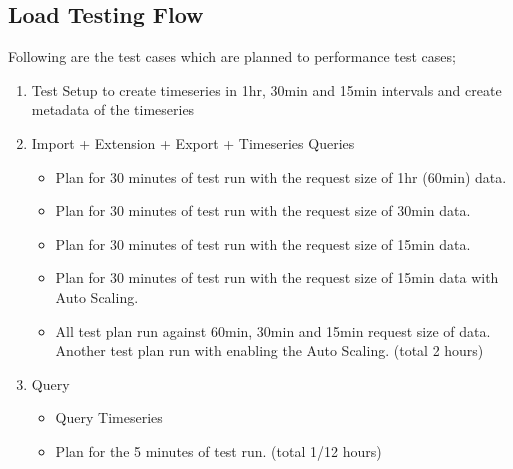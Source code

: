 \subsection{Load Testing Flow}
\label{subse:test_plan_flow}
Following are the test cases which are planned to performance test cases;
\begin{enumerate}
    \item Test Setup to create timeseries in 1hr, 30min and 15min intervals and create metadata of the timeseries
    \item Import + Extension + Export + Timeseries Queries
    \begin{itemize}
        \item Plan for 30 minutes of test run with the request size of 1hr (60min) data.
        \item Plan for 30 minutes of test run with the request size of 30min data.
        \item Plan for 30 minutes of test run with the request size of 15min data.
        \item Plan for 30 minutes of test run with the request size of 15min data with Auto Scaling.
        \item All test plan run against 60min, 30min and 15min request size of data. Another test plan run with enabling the Auto Scaling. (total 2 hours)
    \end{itemize}
    \item Query
    \begin{itemize}
        \item Query Timeseries
        \item Plan for the 5 minutes of test run. (total 1/12 hours)
    \end{itemize}
\end{enumerate}


